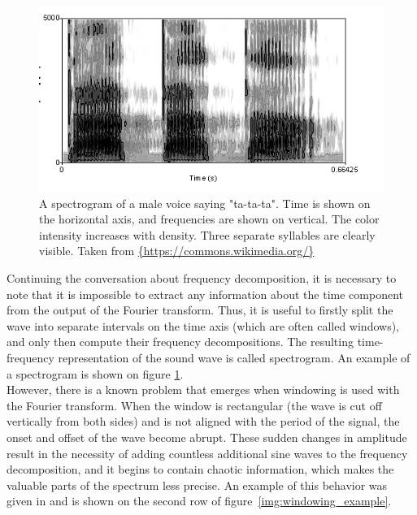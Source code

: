 \begin{figure}[t]
	\centering
	\includegraphics[height=0.25\textheight]{include/spectrogram_example}
	\caption[An example of a spectrogram]{A spectrogram of a male voice saying "ta-ta-ta". Time is shown on the horizontal axis, and frequencies are shown on vertical. The color intensity increases with density. Three separate syllables are clearly visible. Taken from \url{{https://commons.wikimedia.org/}}}
	\label{img:spectrogram_example}
\end{figure}

Continuing the conversation about frequency decomposition, it is necessary to note that it is impossible to extract any information about the time component from the output of the Fourier transform. Thus, it is useful to firstly split the wave into separate intervals on the time axis (which are often called windows), and only then compute their frequency decompositions. The resulting time-frequency representation of the sound wave is called spectrogram. An example of a spectrogram is shown on figure \ref{img:spectrogram_example}.\\

However, there is a known problem that emerges when windowing is used with the Fourier transform. When the window is rectangular (the wave is cut off vertically from both sides) and is not aligned with the period of the signal, the onset and offset of the wave become abrupt. These sudden changes in amplitude result in the necessity of adding countless additional sine waves to the frequency decomposition, and it begins to contain chaotic information, which makes the valuable parts of the spectrum less precise. An example of this behavior was given in \cite{Schnupp2011} and is shown on the second row of figure~\ref{img:windowing_example}.\\

